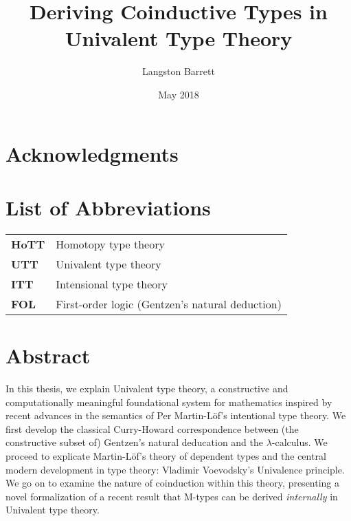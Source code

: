 \documentclass[12pt,twoside,draft]{reedthesis}
\title{Deriving Coinductive Types in Univalent Type Theory}
\author{Langston Barrett}
\date{May 2018}
\begin{document}
\maketitle
\frontmatter %
\pagestyle{empty} %

\chapter*{Acknowledgments}


\chapter*{List of Abbreviations}

\begin{table}[h]
  \centering
  \begin{tabular}{ll}
    \textbf{HoTT}  	&  Homotopy type theory \\
    \textbf{UTT}  	&  Univalent type theory \\
    \textbf{ITT}  	&  Intensional type theory \\
    \textbf{FOL}  	&  First-order logic (Gentzen's natural deduction) \\
  \end{tabular}
\end{table}
	
\setcounter{tocdepth}{4}
\tableofcontents

\chapter*{Abstract}

In this thesis, we explain Univalent type theory, a constructive and
computationally meaningful foundational system for mathematics inspired by
recent advances in the semantics of Per Martin-L\"of's intentional type theory.
We first develop the classical Curry-Howard correspondence between (the
constructive subset of) Gentzen's natural deducation and the $\lambda$-calculus.
We proceed to explicate Martin-L\"of's theory of dependent types and the central
modern development in type theory: Vladimir Voevodsky's Univalence principle. 
We go on to examine the nature of coinduction within this theory, presenting a
novel formalization of a recent result that M-types can be derived
\textit{internally} in Univalent type theory.
\end{document}
